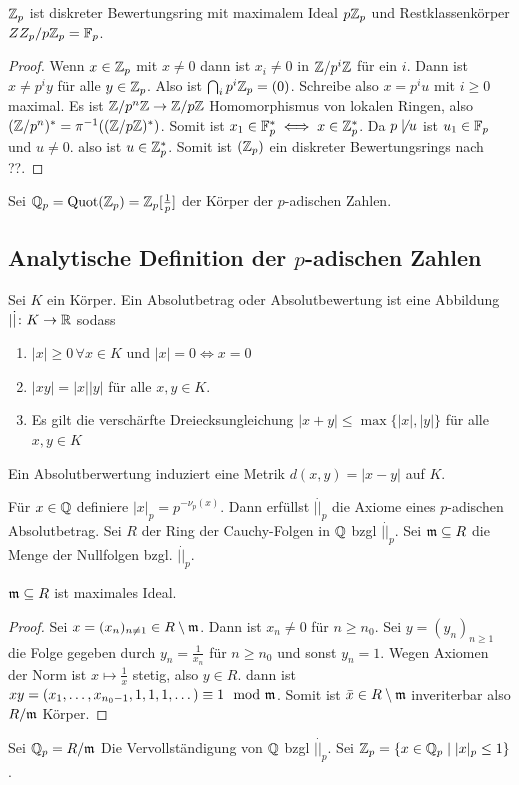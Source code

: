 \begin{Lemma}
	\(\mathbb{Z}_p\) ist diskreter Bewertungsring mit maximalem Ideal
	\(p\mathbb{Z}_p\) und Restklassenkörper \(ZZ_p/p\mathbb{Z}_p=\mathbb{F}_p\).
\end{Lemma}
\begin{proof}
	Wenn \(x\in\mathbb{Z}_p\) mit \(x\neq 0\) dann ist \(x_i\neq 0\) in \(\mathbb{Z}/p^i\mathbb{Z}\) für ein \(i\).
	Dann ist \(x\neq p^iy\) für alle \(y\in\mathbb{Z}_p\).
	Also ist \(\bigcap_i p^i\mathbb{Z}_p=(0)\).
	Schreibe also \(x=p^iu\) mit \(i\geq 0\) maximal.
	Es ist \(\mathbb{Z}/p^n\mathbb{Z}\to \mathbb{Z}/p\mathbb{Z}\) Homomorphismus von lokalen Ringen, also \((\mathbb{Z}/p^n)^*=\pi^{-1}((\mathbb{Z}/p\mathbb{Z})^*)\).
	Somit ist \(x_1\in\mathbb{F}_p^*\iff x\in \mathbb{Z}_p^*\).
	Da \(p\not\mid u\) ist \(u_1\in\mathbb{F}_p\) und \(u\neq 0\).
	also ist \(u\in \mathbb{Z}_p^*\).
	Somit ist \((\mathbb{Z}_p)\) ein diskreter Bewertungsrings nach ??.
	
\end{proof}
\begin{Def}
	Sei \(\mathbb{Q}_p=\operatorname{Quot}(\mathbb{Z}_p)=\mathbb{Z}_p[\frac 1 p]\) der Körper der \(p\)-adischen Zahlen.
\end{Def}
\subsection{Analytische Definition der \(p\)-adischen Zahlen}
\begin{Def}
	Sei \(K\) ein Körper. Ein Absolutbetrag oder Absolutbewertung ist eine Abbildung 
	\(|\dot|\colon K\to\mathbb{R}\) sodass
	\begin{enumerate}
		\item \(|x|\geq 0 \, \forall x\in K\) und \(|x|=0\iff x=0\)
		\item \(|xy|=|x||y|\) für alle \(x,y\in K\).
		\item Es gilt die verschärfte Dreiecksungleichung \(|x+y|\leq \max\{|x|,|y|\}\) für alle \(x,y\in K\)
	\end{enumerate}
	Ein Absolutberwertung induziert eine Metrik \(d(x,y)=|x-y|\) auf \(K\).
\end{Def}
\begin{Def}
	Für \(x\in\mathbb{Q}\) definiere \(|x|_p=p^{-\nu_p(x)}\).
	Dann erfüllst \(|\dot|_p\) die Axiome eines \(p\)-adischen Absolutbetrag.
	Sei \(R\) der Ring der Cauchy-Folgen in \(\mathbb{Q}\) bzgl \(|\dot|_p\). Sei \(\mathfrak{m}\subseteq R\) die Menge der Nullfolgen bzgl. \(|\dot|_p\).
\end{Def}
\begin{Lemma}
	\(\mathfrak{m}\subseteq R\) ist maximales Ideal.
\end{Lemma}
\begin{proof}
	Sei \(x=(x_n)_{n\neq 1}\in R\setminus \mathfrak{m}\).
	Dann ist \(x_n\neq 0\) für \(n\geq n_0\). 
	Sei \(y=(y_n)_{n\geq 1}\) die Folge gegeben durch \(y_n=\frac{1}{x_n}\) für \(n\geq n_0\) und sonst \(y_n=1\). Wegen Axiomen der Norm ist \(x\mapsto \frac 1 x\) stetig, also \(y\in R\).
	dann ist \(xy=(x_1,\dots,x_{n_0-1},1,1,1,\dots)\equiv 1\mod {\mathfrak{m}}\). Somit ist \(\bar x\in R\setminus \mathfrak{m}\) inveriterbar also \(R/\mathfrak{m}\) Körper.
\end{proof}
\begin{Def}
	Sei \(\mathbb{Q}_p=R/\mathfrak{m}\) Die Vervollständigung von \(\mathbb{Q}\) bzgl \(|\dot|_p\). Sei \(\mathbb{Z}_p=\{x\in\mathbb{Q}_p\mid |x|_p\leq 1\}\).
\end{Def}